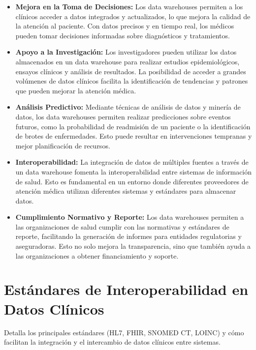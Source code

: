 \documentclass[12pt, a4paper, twoside]{article}
\begin{document}
	\begin{itemize}
		\item \textbf{Mejora en la Toma de Decisiones:} Los data warehouses permiten a los clínicos acceder a datos integrados y actualizados, lo que mejora la calidad de la atención al paciente. Con datos precisos y en tiempo real, los médicos pueden tomar decisiones informadas sobre diagnósticos y tratamientos.
		
		\item \textbf{Apoyo a la Investigación:} Los investigadores pueden utilizar los datos almacenados en un data warehouse para realizar estudios epidemiológicos, ensayos clínicos y análisis de resultados. La posibilidad de acceder a grandes volúmenes de datos clínicos facilita la identificación de tendencias y patrones que pueden mejorar la atención médica.
		
		\item \textbf{Análisis Predictivo:} Mediante técnicas de análisis de datos y minería de datos, los data warehouses permiten realizar predicciones sobre eventos futuros, como la probabilidad de readmisión de un paciente o la identificación de brotes de enfermedades. Esto puede resultar en intervenciones tempranas y mejor planificación de recursos.
		
		\item \textbf{Interoperabilidad:} La integración de datos de múltiples fuentes a través de un data warehouse fomenta la interoperabilidad entre sistemas de información de salud. Esto es fundamental en un entorno donde diferentes proveedores de atención médica utilizan diferentes sistemas y estándares para almacenar datos.
		
		\item \textbf{Cumplimiento Normativo y Reporte:} Los data warehouses permiten a las organizaciones de salud cumplir con las normativas y estándares de reporte, facilitando la generación de informes para entidades regulatorias y aseguradoras. Esto no solo mejora la transparencia, sino que también ayuda a las organizaciones a obtener financiamiento y soporte.
		
	\end{itemize}


	
	\section{Estándares de Interoperabilidad en Datos Clínicos}
	Detalla los principales estándares (HL7, FHIR, SNOMED CT, LOINC) y cómo facilitan la integración y el intercambio de datos clínicos entre sistemas.
	
\end{document}
